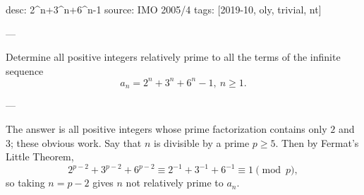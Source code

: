 desc: 2^n+3^n+6^n-1
source: IMO 2005/4
tags: [2019-10, oly, trivial, nt]

---

Determine all positive integers relatively prime to all the terms of the infinite sequence \[a_n=2^n+3^n+6^n-1,\ n\ge 1.\]

---

The answer is all positive integers whose prime factorization contains only $2$ and $3$; these obvious work. Say that $n$ is divisible by a prime $p\ge5$. Then by Fermat's Little Theorem, \[2^{p-2}+3^{p-2}+6^{p-2}\equiv 2^{-1}+3^{-1}+6^{-1}\equiv1\pmod p,\]
so taking $n=p-2$ gives $n$ not relatively prime to $a_n$.
